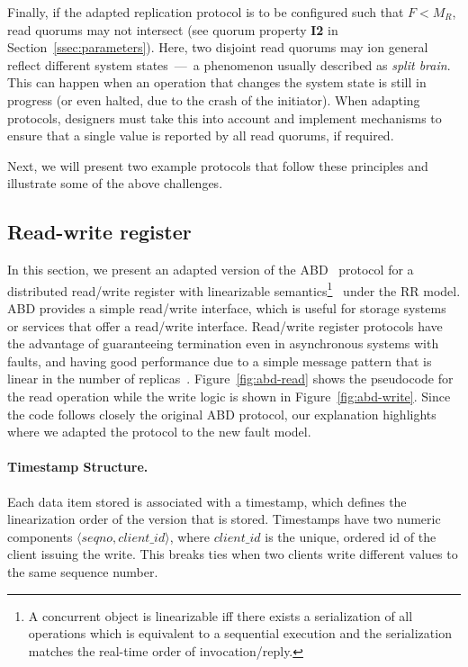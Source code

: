 Finally, if the adapted replication protocol is to be configured such
that $F<M_R$, read quorums may not intersect (see quorum property
\textbf{I2} in Section~\ref{ssec:parameters}).  Here, two disjoint
read quorums may ion general reflect different system states~---~a
phenomenon usually described as {\em split brain}.  This can happen
when an operation that changes the system state is still in progress
(or even halted, due to the crash of the initiator). When adapting
protocols, designers must take this into account and implement
mechanisms to ensure that a single value is reported by all read
quorums, if required.

Next, we will present two example protocols that follow these
principles and illustrate some of the above challenges.

\subsection{Read-write register}\label{ssec:abd}

In this section, we present an adapted version of the ABD~\cite{abd}
protocol for a distributed read/write register with linearizable
semantics\footnote{A concurrent object is
linearizable iff there exists a serialization of all operations
which is equivalent to a sequential execution and the
serialization matches the real-time order of invocation/reply.}~\cite{linearizability} under the \ac{RR} model. ABD provides a simple
read/write interface, which is useful for storage systems or services
that offer a read/write interface. Read/write register protocols have
the advantage of guaranteeing termination even in asynchronous systems
with faults, and having good performance due to a simple message
pattern that is linear in the number of replicas~\cite{gryff:nsdi20}.
%
Figure~\ref{fig:abd-read} shows the pseudocode for the read operation
while the write logic is shown in Figure~\ref{fig:abd-write}. Since
the code follows closely the original ABD protocol, our
explanation highlights where we adapted the protocol to the
new fault model.

\paragraph{Timestamp Structure.}
Each data item stored is associated with a
timestamp, which defines the linearization order of the version
that is stored. Timestamps have two numeric components $\langle
seqno, client\_id \rangle$, where $client\_id$ is the
unique, ordered id of the client issuing the write.  This
breaks ties when two clients write different values to the same
sequence number.

